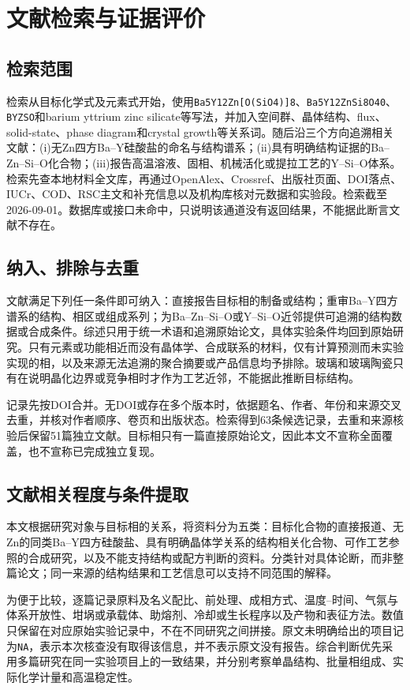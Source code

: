 \section{文献检索与证据评价}
\label{sec:review-method}

\subsection{检索范围}

检索从目标化学式及元素式开始，使用\texttt{Ba5Y12Zn[O(SiO4)]8}、\texttt{Ba5Y12ZnSi8O40}、\texttt{BYZSO}和barium yttrium zinc silicate等写法，并加入空间群、晶体结构、flux、solid-state、phase diagram和crystal growth等关系词。随后沿三个方向追溯相关文献：(i)无Zn四方Ba--Y硅酸盐的命名与结构谱系；(ii)具有明确结构证据的Ba--Zn--Si--O化合物；(iii)报告高温溶液、固相、机械活化或提拉工艺的Y--Si--O体系。检索先查本地材料全文库，再通过OpenAlex、Crossref、出版社页面、DOI落点、IUCr、COD、RSC主文和补充信息以及机构库核对元数据和实验段。检索截至2026-09-01。数据库或接口未命中，只说明该通道没有返回结果，不能据此断言文献不存在。

\subsection{纳入、排除与去重}

文献满足下列任一条件即可纳入：直接报告目标相的制备或结构；重审Ba--Y四方谱系的结构、相区或组成系列；为Ba--Zn--Si--O或Y--Si--O近邻提供可追溯的结构数据或合成条件。综述只用于统一术语和追溯原始论文，具体实验条件均回到原始研究。只有元素或功能相近而没有晶体学、合成联系的材料，仅有计算预测而未实验实现的相，以及来源无法追溯的聚合摘要或产品信息均予排除。玻璃和玻璃陶瓷只有在说明晶化边界或竞争相时才作为工艺近邻，不能据此推断目标结构。

记录先按DOI合并。无DOI或存在多个版本时，依据题名、作者、年份和来源交叉去重，并核对作者顺序、卷页和出版状态。检索得到63条候选记录，去重和来源核验后保留51篇独立文献。目标相只有一篇直接原始论文，因此本文不宣称全面覆盖，也不宣称已完成独立复现。

\subsection{文献相关程度与条件提取}

本文根据研究对象与目标相的关系，将资料分为五类：目标化合物的直接报道、无Zn的同类Ba--Y四方硅酸盐、具有明确晶体学关系的结构相关化合物、可作工艺参照的合成研究，以及不能支持结构或配方判断的资料。分类针对具体论断，而非整篇论文；同一来源的结构结果和工艺信息可以支持不同范围的解释。

为便于比较，逐篇记录原料及名义配比、前处理、成相方式、温度--时间、气氛与体系开放性、坩埚或承载体、助熔剂、冷却或生长程序以及产物和表征方法。数值只保留在对应原始实验记录中，不在不同研究之间拼接。原文未明确给出的项目记为\texttt{NA}，表示本次核查没有取得该信息，并不表示原文没有报告。综合判断优先采用多篇研究在同一实验项目上的一致结果，并分别考察单晶结构、批量相组成、实际化学计量和高温稳定性。
